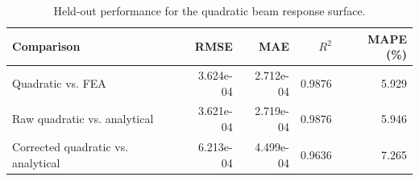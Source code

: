\begin{table}[htbp]
\centering
\caption{Held-out performance for the quadratic beam response surface.}
\label{tab:quadratic-validation}
\begin{tabular}{lrrrr}
\toprule
Comparison & RMSE & MAE & $R^2$ & MAPE (\%) \\
\midrule
Quadratic vs. FEA & 3.624e-04 & 2.712e-04 & 0.9876 & 5.929 \\
Raw quadratic vs. analytical & 3.621e-04 & 2.719e-04 & 0.9876 & 5.946 \\
Corrected quadratic vs. analytical & 6.213e-04 & 4.499e-04 & 0.9636 & 7.265 \\
\bottomrule
\end{tabular}
\end{table}
